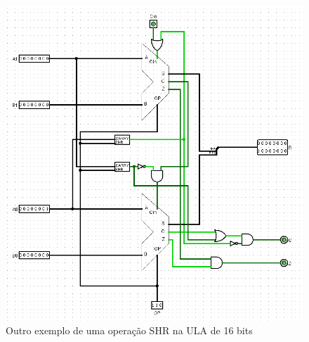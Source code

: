 \documentclass[
	12pt,				%
	openright,			%
	twoside,			%
	a4paper,			%
	english,			%
	french,				%
	spanish,			%
	brazil,				%
	]{abntex2}
\begin{document}
\begin{apendicesenv}
\begin{itemize}
\begin{figure}[p]
	\begin{center}
	    \includegraphics[scale=0.6]{ULA16SHR_2.png}
	\end{center}
\caption{\label{ula16shr2}Outro exemplo de uma operação SHR na ULA de 16 bits}
\end{figure}

\end{itemize}

\end{apendicesenv}
\end{document}
